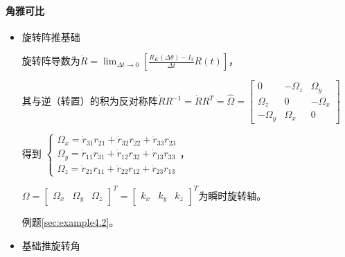 \documentclass[
12pt, %
a4paper, 
oneside, %
headinclude,footinclude, %
]{scrartcl}
\begin{document}
\paragraph{角雅可比}
\begin{itemize}
\item 旋转阵推基础\label{sec:Rotation_matrix}

旋转阵导数为$ \dot{R} = \lim_{\Delta t \to 0} [\frac{R_K(\Delta\theta) - I_3}{\Delta t} R(t)] $，

其与逆（转置）的积为反对称阵$ \dot{R} R^{-1} = \dot{R} R^T = \hat{\Omega} = \begin{bmatrix} 0 & -\Omega_z & \Omega_y \\ \Omega_z & 0 & -\Omega_x \\ -\Omega_y & \Omega_x & 0 \end{bmatrix} $

得到
$
\begin{cases}
\Omega_x = \dot{r}_{31} r_{21} + \dot{r}_{32} r_{22} + \dot{r}_{33} r_{23} \\
\Omega_y = \dot{r}_{11} r_{31} + \dot{r}_{12} r_{32} + \dot{r}_{13} r_{33} \\
\Omega_z = \dot{r}_{21} r_{11} + \dot{r}_{22} r_{12} + \dot{r}_{23} r_{13}
\end{cases}
$，

$ \Omega = \begin{bmatrix} \Omega_x & \Omega_y & \Omega_z \end{bmatrix}^T = \begin{bmatrix} k_x & k_y & k_z \end{bmatrix}^T $为瞬时旋转轴。

例题\ref{sec:example4.2}。
\item 基础推旋转角


\end{itemize}
\end{document}
